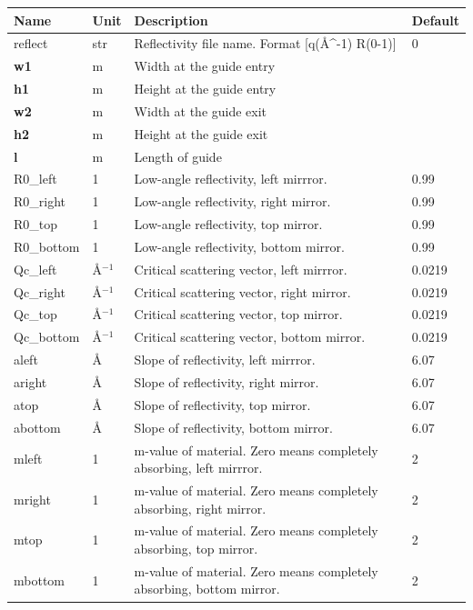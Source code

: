 \begin{longtable}{p{}p{}p{}p{}}
\toprule
\textbf{Name} & \textbf{Unit} & \textbf{Description} & \textbf{Default} \\
\midrule
\endhead
reflect & str & Reflectivity file name. Format [q(\AA{}\textasciicircum{}-1) R(0-1)] & 0 \\
\textbf{w1} & m & Width at the guide entry &  \\
\textbf{h1} & m & Height at the guide entry &  \\
\textbf{w2} & m & Width at the guide exit &  \\
\textbf{h2} & m & Height at the guide exit &  \\
\textbf{l} & m & Length of guide &  \\
R0\_left & 1 & Low-angle reflectivity, left mirrror. & 0.99 \\
R0\_right & 1 & Low-angle reflectivity, right mirror. & 0.99 \\
R0\_top & 1 & Low-angle reflectivity, top mirror. & 0.99 \\
R0\_bottom & 1 & Low-angle reflectivity, bottom mirror. & 0.99 \\
Qc\_left & \AA{}$^{-1}$ & Critical scattering vector, left mirrror. & 0.0219 \\
Qc\_right & \AA{}$^{-1}$ & Critical scattering vector, right mirror. & 0.0219 \\
Qc\_top & \AA{}$^{-1}$ & Critical scattering vector, top mirror. & 0.0219 \\
Qc\_bottom & \AA{}$^{-1}$ & Critical scattering vector, bottom mirror. & 0.0219 \\
aleft & \AA{} & Slope of reflectivity, left mirrror. & 6.07 \\
aright & \AA{} & Slope of reflectivity, right mirror. & 6.07 \\
atop & \AA{} & Slope of reflectivity, top mirror. & 6.07 \\
abottom & \AA{} & Slope of reflectivity, bottom mirror. & 6.07 \\
mleft & 1 & m-value of material. Zero means completely absorbing, left mirrror. & 2 \\
mright & 1 & m-value of material. Zero means completely absorbing, right mirror. & 2 \\
mtop & 1 & m-value of material. Zero means completely absorbing, top mirror. & 2 \\
mbottom & 1 & m-value of material. Zero means completely absorbing, bottom mirror. & 2 \\

\end{longtable}
